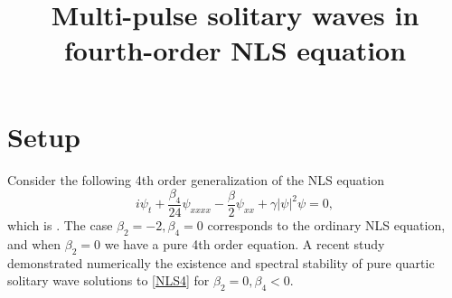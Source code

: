 \documentclass[12pt]{article}
\title{Multi-pulse solitary waves in fourth-order NLS equation}
\begin{document}
\maketitle






\section{Setup}

Consider the following 4th order generalization of the NLS equation
\begin{equation}\label{NLS4}
i \psi_t + \frac{\beta_4}{24}\psi_{xxxx} - \frac{\beta}{2}\psi_{xx} + \gamma |\psi|^2 \psi = 0,
\end{equation}
which is \cite[(4)]{Tam2020}. The case $\beta_2 = -2, \beta_4 = 0$ corresponds to the ordinary NLS equation, and when $\beta_2 = 0$ we have a pure 4th order equation. A recent study \cite{Tam2019} demonstrated numerically the existence and spectral stability of pure quartic solitary wave solutions to \cref{NLS4} for $\beta_2 = 0, \beta_4 < 0$.
\end{document}
